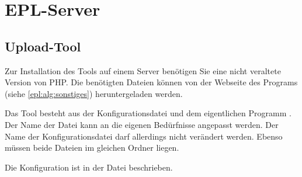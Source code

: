 \part{EPL-Server}\label{server}
\chapter{Upload-Tool}\label{server:upload}
Zur Installation des Tools auf einem Server benötigen Sie eine nicht veraltete Version von PHP.
Die benötigten Dateien können von der Webseite des Programs (siehe \cref{epl:alg:sonstiges}) heruntergeladen werden.

Das Tool besteht aus der Konfigurationsdatei  und dem eigentlichen Programm .
Der Name der Datei  kann an die eigenen Bedürfnisse angepasst werden.
Der Name der Konfigurationsdatei darf allerdings nicht verändert werden.
Ebenso müssen beide Dateien im gleichen Ordner liegen.

Die Konfiguration ist in der Datei  beschrieben.
